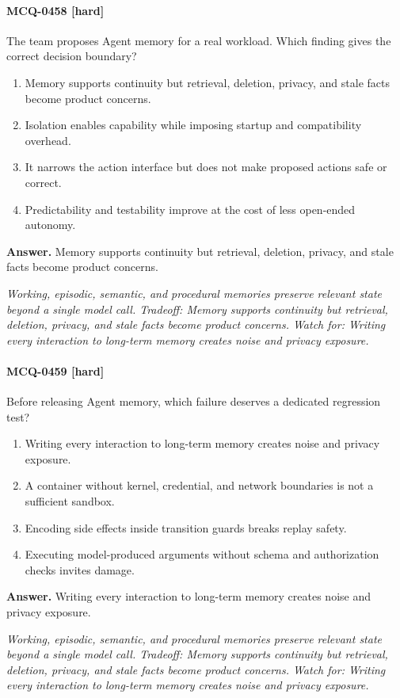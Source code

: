 \paragraph{MCQ-0458 [hard]} The team proposes Agent memory for a real workload. Which finding gives the correct decision boundary?
\begin{enumerate}[label=\Alph*.]
\item Memory supports continuity but retrieval, deletion, privacy, and stale facts become product concerns.
\item Isolation enables capability while imposing startup and compatibility overhead.
\item It narrows the action interface but does not make proposed actions safe or correct.
\item Predictability and testability improve at the cost of less open-ended autonomy.
\end{enumerate}
\noindent\textbf{Answer.} Memory supports continuity but retrieval, deletion, privacy, and stale facts become product concerns.
\par\textit{Working, episodic, semantic, and procedural memories preserve relevant state beyond a single model call. Tradeoff: Memory supports continuity but retrieval, deletion, privacy, and stale facts become product concerns. Watch for: Writing every interaction to long-term memory creates noise and privacy exposure.}
\paragraph{MCQ-0459 [hard]} Before releasing Agent memory, which failure deserves a dedicated regression test?
\begin{enumerate}[label=\Alph*.]
\item Writing every interaction to long-term memory creates noise and privacy exposure.
\item A container without kernel, credential, and network boundaries is not a sufficient sandbox.
\item Encoding side effects inside transition guards breaks replay safety.
\item Executing model-produced arguments without schema and authorization checks invites damage.
\end{enumerate}
\noindent\textbf{Answer.} Writing every interaction to long-term memory creates noise and privacy exposure.
\par\textit{Working, episodic, semantic, and procedural memories preserve relevant state beyond a single model call. Tradeoff: Memory supports continuity but retrieval, deletion, privacy, and stale facts become product concerns. Watch for: Writing every interaction to long-term memory creates noise and privacy exposure.}
